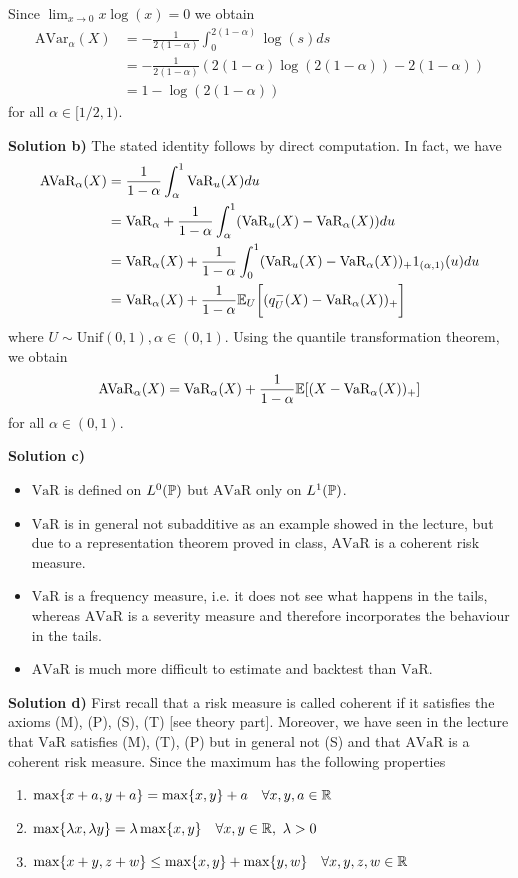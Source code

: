 Since $\lim_{x\to 0} x\log(x) = 0$ we obtain
\begin{align*}
    \text{AVar}_\alpha(X) &= -\frac{1}{2(1-\alpha)}\int_0^{2(1-\alpha)}\log(s) ds \\
    &= -\frac{1}{2(1-\alpha)}(2(1-\alpha)\log(2(1-\alpha)) - 2(1-\alpha)) \\
    &= 1 - \log(2(1-\alpha))
\end{align*}
for all $\alpha \in [1/2, 1)$.

\textbf{Solution b)}
The stated identity follows by direct computation. In fact, we have
\begin{align*}
    \text{AVaR}_\alpha(X) &= \frac{1}{1-\alpha}\int_\alpha^1 \text{VaR}_u(X) du \\
    &= \text{VaR}_\alpha + \frac{1}{1-\alpha}\int_\alpha^1 ( \text{VaR}_u(X) - \text{VaR}_\alpha(X)) du \\
    &= \text{VaR}_\alpha(X) + \frac{1}{1-\alpha}\int_0^1 ( \text{VaR}_u(X) - \text{VaR}_\alpha(X) )_+ 1_{(\alpha, 1)}(u)du \\
    &= \text{VaR}_\alpha(X) + \frac{1}{1-\alpha}\mathbb{E}_U\bigg[(q_U^{-}(X) - \text{VaR}_\alpha(X))_+\bigg]
\end{align*}
where $U \sim \text{Unif}(0,1), \alpha \in (0,1)$. Using the quantile transformation theorem, we obtain
\[
    \text{AVaR}_\alpha(X) = \text{VaR}_\alpha(X) + \frac{1}{1-\alpha} \mathbb{E}[(X - \text{VaR}_\alpha(X))_+]
\]
for all $\alpha\in (0,1)$.

\textbf{Solution c)}
\begin{itemize}
    \item $\text{VaR}$ is defined on $L^0(\mathbb{P})$ but $\text{AVaR}$ only on $L^1(\mathbb{P})$.
    \item $\text{VaR}$ is in general not subadditive as an example showed in the lecture, but due to a representation theorem proved in class, $\text{AVaR}$ is a coherent risk measure.
    \item $\text{VaR}$ is a frequency measure, i.e. it does not see what happens in the tails, whereas $\text{AVaR}$ is a severity measure and therefore incorporates the behaviour in the tails.
    \item $\text{AVaR}$ is much more difficult to estimate and backtest than $\text{VaR}$.
\end{itemize}

\textbf{Solution d)}
First recall that a risk measure is called coherent if it satisfies the axioms (M), (P), (S), (T) [see theory part]. Moreover, we have seen in the lecture that $\text{VaR}$ satisfies (M), (T), (P) but in general not (S) and that $\text{AVaR}$ is a coherent risk measure. Since the maximum has the following properties
\begin{enumerate}
    \item $\max\{x + a, y + a\} = \max\{x,y\} + a \quad \forall x,y,a\in\mathbb{R}$
    \item $\max\{\lambda x, \lambda y\} = \lambda\max\{x,y\} \quad \forall x,y\in \mathbb{R}, \ \lambda > 0$
    \item $\max\{x+y, z+ w\} \leq \max\{x,y\} + \max\{y,w\} \quad \forall x,y,z,w\in\mathbb{R}$
\end{enumerate}

